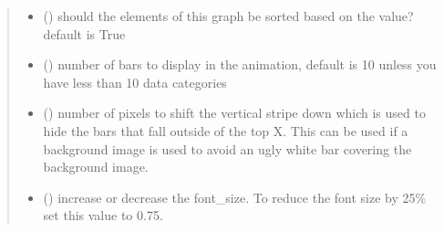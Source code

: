 \documentclass[letterpaper,10pt,english]{sphinxmanual}
\begin{document}
\begin{fulllineitems}
\begin{quote}
\begin{description}
\begin{itemize}
\item {} 
\sphinxAtStartPar
{} () \textendash{} should the elements of this graph be sorted based on the value? default is True

\item {} 
\sphinxAtStartPar
{} () \textendash{} number of bars to display in the animation, default is 10 unless you have less than 10 data categories

\item {} 
\sphinxAtStartPar
{} () \textendash{} number of pixels to shift the vertical stripe down which is used to hide the bars that fall outside of the top X. This can be used if a background image is used to avoid an ugly white bar covering the background image.

\item {} 
\sphinxAtStartPar
{} () \textendash{} increase or decrease the font\_size. To reduce the font size by 25\% set this value to 0.75.

\end{itemize}

\end{description}\end{quote}

\begin{fulllineitems}
\label{\detokenize{index:sjvisualizer.BarRace_legacy.bar_race.draw}}
\pysigstartsignatures
{}
\pysigstopsignatures
\end{fulllineitems}


\begin{fulllineitems}
\label{\detokenize{index:sjvisualizer.BarRace_legacy.bar_race.update}}
\pysigstartsignatures
{}
\pysigstopsignatures
\end{fulllineitems}


\end{fulllineitems}
\end{document}

